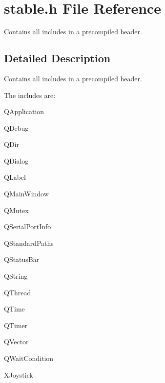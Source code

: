 \hypertarget{a00022}{}\section{stable.\+h File Reference}
\label{a00022}


Contains all includes in a precompiled header.  




\subsection{Detailed Description}
Contains all includes in a precompiled header. 

The includes are\+:
\begin{DoxyItemize}
\item Q\+Application
\item Q\+Debug
\item Q\+Dir
\item Q\+Dialog
\item Q\+Label
\item Q\+Main\+Window
\item Q\+Mutex
\item Q\+Serial\+Port\+Info
\item Q\+Standard\+Paths
\item Q\+Status\+Bar
\item Q\+String
\item Q\+Thread
\item Q\+Time
\item Q\+Timer
\item Q\+Vector
\item Q\+Wait\+Condition
\item X\+Joystick 
\end{DoxyItemize}